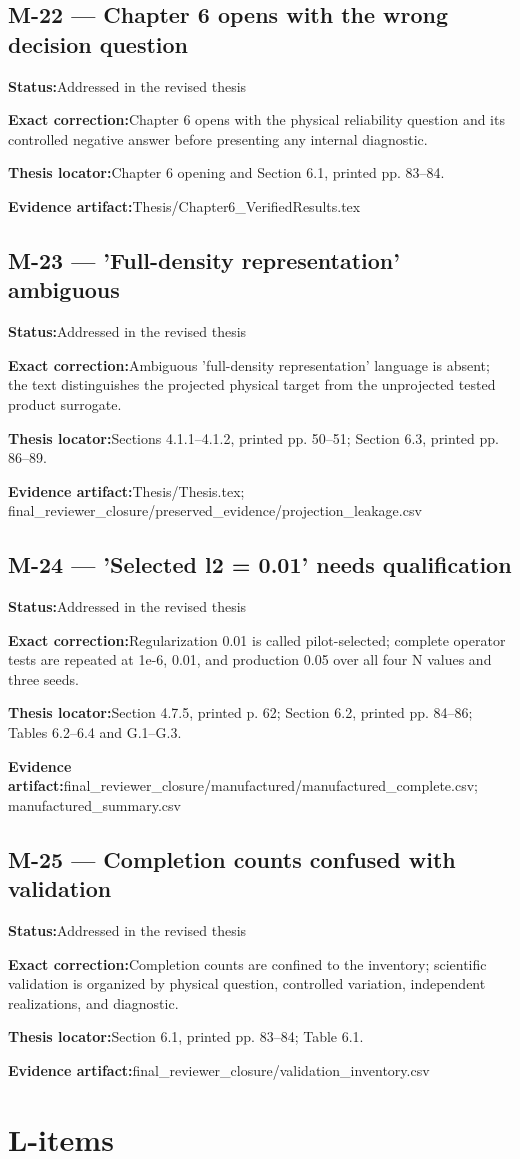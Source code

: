 \documentclass[11pt]{article}
\newcommand{\field}[2]{\textbf{#1}\quad #2\par}
\begin{document}
\subsection*{M-22 --- Chapter 6 opens with the wrong decision question}
\field{Status:}{Addressed in the revised thesis}
\field{Exact correction:}{Chapter 6 opens with the physical reliability question and its controlled negative answer before presenting any internal diagnostic.}
\field{Thesis locator:}{Chapter 6 opening and Section 6.1, printed pp. 83--84.}
\field{Evidence artifact:}{Thesis/Chapter6\_VerifiedResults.tex}
\subsection*{M-23 --- 'Full-density representation' ambiguous}
\field{Status:}{Addressed in the revised thesis}
\field{Exact correction:}{Ambiguous 'full-density representation' language is absent; the text distinguishes the projected physical target from the unprojected tested product surrogate.}
\field{Thesis locator:}{Sections 4.1.1--4.1.2, printed pp. 50--51; Section 6.3, printed pp. 86--89.}
\field{Evidence artifact:}{Thesis/Thesis.tex; final\_reviewer\_closure/preserved\_evidence/projection\_leakage.csv}
\subsection*{M-24 --- 'Selected l2 = 0.01' needs qualification}
\field{Status:}{Addressed in the revised thesis}
\field{Exact correction:}{Regularization 0.01 is called pilot-selected; complete operator tests are repeated at 1e-6, 0.01, and production 0.05 over all four N values and three seeds.}
\field{Thesis locator:}{Section 4.7.5, printed p. 62; Section 6.2, printed pp. 84--86; Tables 6.2--6.4 and G.1--G.3.}
\field{Evidence artifact:}{final\_reviewer\_closure/manufactured/manufactured\_complete.csv; manufactured\_summary.csv}
\subsection*{M-25 --- Completion counts confused with validation}
\field{Status:}{Addressed in the revised thesis}
\field{Exact correction:}{Completion counts are confined to the inventory; scientific validation is organized by physical question, controlled variation, independent realizations, and diagnostic.}
\field{Thesis locator:}{Section 6.1, printed pp. 83--84; Table 6.1.}
\field{Evidence artifact:}{final\_reviewer\_closure/validation\_inventory.csv}
\section*{L-items}
\end{document}

